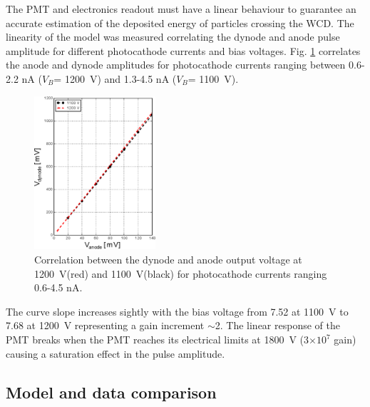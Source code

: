 \documentclass[letterpaper, 10 pt, conference]{ieeeconf}  %
\begin{document}


The PMT and electronics readout must have a linear behaviour to guarantee an accurate estimation of the deposited energy of particles crossing the WCD. The linearity of the model was measured correlating the dynode and anode pulse amplitude for different photocathode currents and bias voltages. Fig. \ref{Linear} correlates the anode and dynode amplitudes for photocathode currents ranging between 0.6-2.2 nA ($V_B$= 1200~V) and 1.3-4.5 nA ($V_B$= 1100~V).

\begin{figure}[h!]
\begin{center}
\includegraphics[width=0.4\textwidth]{Figures/Linear.eps}
\caption{Correlation between the dynode and anode output voltage at 1200~V(red) and 1100~V(black) for photocathode currents ranging 0.6-4.5 nA.}
\label{Linear}
\end{center}
\end{figure}

The curve slope increases sightly with the bias voltage from 7.52 at 1100~V to 7.68 at 1200~V representing a gain increment $\sim$2. The linear response of the PMT breaks when the PMT reaches its electrical limits at 1800~V (3$\times10^7$ gain) causing a saturation effect in the pulse amplitude. 

\subsection{Model and data comparison}
\end{document}
